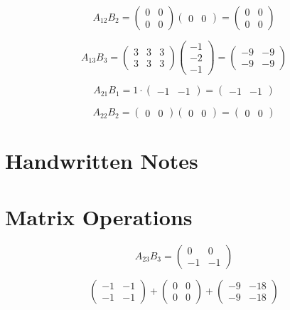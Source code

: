 \documentclass[a4paper, 12pt]{article}
\begin{document}
\[
A_{12} B_2 = \begin{pmatrix}
0 & 0 \\
0 & 0
\end{pmatrix}
\begin{pmatrix}
0 & 0
\end{pmatrix}
= \begin{pmatrix}
0 & 0 \\
0 & 0
\end{pmatrix}
\]

\[
A_{13} B_3 = \begin{pmatrix}
3 & 3 & 3 \\
3 & 3 & 3
\end{pmatrix}
\begin{pmatrix}
-1 \\
-2 \\
-1
\end{pmatrix}
= \begin{pmatrix}
-9 & -9 \\
-9 & -9
\end{pmatrix}
\]

\[
A_{21} B_1 = 1 \cdot \begin{pmatrix}
-1 & -1
\end{pmatrix}
= \begin{pmatrix}
-1 & -1
\end{pmatrix}
\]

\[
A_{22} B_2 = \begin{pmatrix}
0 & 0
\end{pmatrix}
\begin{pmatrix}
0 & 0
\end{pmatrix}
= \begin{pmatrix}
0 & 0
\end{pmatrix}
\]

\section{Handwritten Notes}





\section*{Matrix Operations}
\[
A_{23} B_{3} = \begin{pmatrix}
0 & 0 \\
-1 & -1
\end{pmatrix}
\]

\[
\begin{pmatrix}
-1 & -1 \\
-1 & -1
\end{pmatrix}
+ \begin{pmatrix}
0 & 0 \\
0 & 0
\end{pmatrix}
+ \begin{pmatrix}
-9 & -18 \\
-9 & -18
\end{pmatrix}
\]
\end{document}
